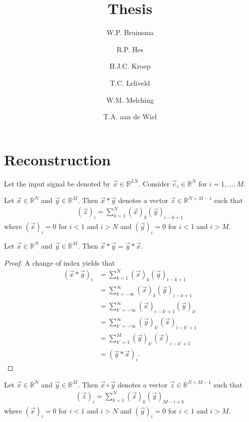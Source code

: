 \documentclass[a4paper, openany, oneside]{memoir}
\title{Thesis}
\author{W.P. Bruinsma \and R.P. Hes \and H.J.C. Kroep \and T.C. Leliveld \and W.M. Melching \and T.A. aan de Wiel}
\begin{document}
\frontmatter

\begin{titlingpage}
  \pagestyle{empty}
  \maketitle
\end{titlingpage}

\chapter{Reconstruction}
Let the input signal be denoted by $\vec{x} \in \mathbb{R}^{LN}$. Consider $\vec{c}_i \in \mathbb{R}^{N}$ for $i = 1,\ldots,M$.

\begin{definition}[Convolution]
    Let $\vec{x} \in \mathbb{R}^N$ and $\vec{y} \in \mathbb{R}^M$. Then $\vec{x} \ast \vec{y}$ denotes a vector $\vec{z} \in \mathbb{R}^{N+M-1}$ such that
    \begin{align*}
        (\vec{z})_i = \sum_{k=1}^{N} (\vec{x})_k (\vec{y})_{i-k+1}
    \end{align*}
    where $(\vec{x})_i=0$ for $i < 1$ and $i > N$ and $(\vec{y})_i=0$ for $i < 1$ and $i > M$.
\end{definition}

\begin{theorem}
    Let $\vec{x} \in \mathbb{R}^N$ and $\vec{y} \in \mathbb{R}^M$. Then $\vec{x} \ast \vec{y} = \vec{y} \ast \vec{x}$.
\end{theorem}
\begin{proof}
    A change of index yields that
    \begin{align*}
        (\vec{x} \ast \vec{y})_i &= \sum_{k=1}^{N} (\vec{x})_k (\vec{y})_{i-k+1} \\
        &= \sum_{k=-\infty}^{\infty} (\vec{x})_k (\vec{y})_{i-k+1} \\
        &= \sum_{k'=-\infty}^{\infty} (\vec{x})_{i-k'+1} (\vec{y})_{k'} \\
        &= \sum_{k'=-\infty}^{\infty} (\vec{y})_{k'} (\vec{x})_{i-k'+1} \\
        &= \sum_{k'=1}^{M} (\vec{y})_{k'} (\vec{x})_{i-k'+1} \\
        &= (\vec{y} \ast \vec{x})_i.
    \end{align*}
\end{proof}

\begin{definition}[Correlation]
    Let $\vec{x} \in \mathbb{R}^N$ and $\vec{y} \in \mathbb{R}^M$. Then $\vec{x} \circ \vec{y}$ denotes a vector $\vec{z} \in \mathbb{R}^{N+M-1}$ such that
    \begin{align*}
        (\vec{z})_i = \sum_{k=1}^{N} (\vec{x})_k (\vec{y})_{M-i+k}
    \end{align*}
    where $(\vec{x})_i=0$ for $i < 1$ and $i > N$ and $(\vec{y})_i=0$ for $i < 1$ and $i > M$.
\end{definition}
\end{document}
